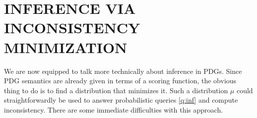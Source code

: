 \documentclass[twoside]{article}
\begin{document}
\section{INFERENCE VIA INCONSISTENCY MINIMIZATION}
    \label{sec:inf-via-inc}

We are now equipped to talk more technically about inference in PDGs. 
Since PDG semantics are already given in terms of a scoring function,
the obvious thing to do is to find a distribution that minimizes it.
Such a distribution $\mu$ could straightforwardly be used to answer probabilistic queries \eqref{q:inf} and compute inconsistency.  
There are some immediate difficulties with this approach.
\end{document}
